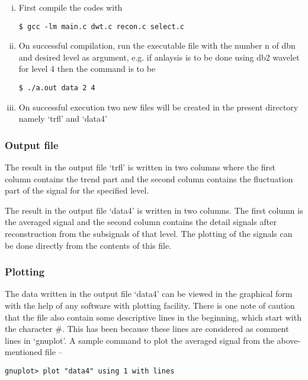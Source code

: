 \documentclass[a4paper,11pt]{report}
\begin{document}
\begin{enumerate}[(i)]
\item First compile the codes with
\begin{verbatim}
$ gcc -lm main.c dwt.c recon.c select.c
\end{verbatim}

\item On successful compilation, run the executable file with the number n of dbn and desired level as argument, e.g. if anlaysis is to be done using db2 wavelet for level 4 then the command is to be 

\begin{verbatim}
$ ./a.out data 2 4
\end{verbatim}

\item On successful execution two new files will be created in the present directory namely `trfl' and `data4'
\end{enumerate}

\subsubsection{Output file}

The result in the output file `trfl' is written in two columns where the first column contains the trend part and the second column contains the fluctuation part of the signal for the specified level.

The result in the output file `data4' is written in two columns. The first column is the averaged signal and the second column contains the detail signals after reconstruction from the subsignals of that level. The plotting of the signals can be done directly from the contents of this file.

\subsubsection{Plotting}

The data written in the output file `data4' can be viewed in the graphical form with the help of any software with plotting facility. There is one note of caution that the file also contain some descriptive lines in the beginning, which start with the character \#. This has been because these lines are considered as comment lines in `gnuplot'. A sample command to plot the averaged signal from the above-mentioned file --

\begin{verbatim}
gnuplot> plot "data4" using 1 with lines
\end{verbatim}
\end{document}
